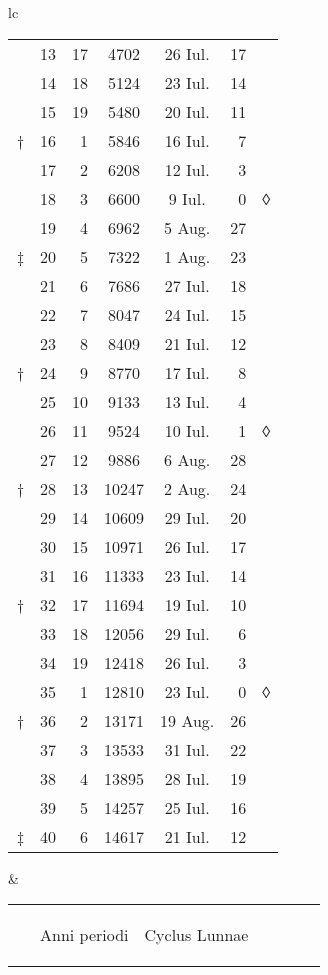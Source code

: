 \begin{tabular}{lc}
\begin{tabular}[t]{r rrccr l}
\cline{2-6}
~ & 13 & 17 & 4702 & 26 Iul. & 17 \\
~ & 14 & 18 & 5124 & 23 Iul. & 14 \\
~ & 15 & 19 & 5480 & 20 Iul. & 11 \\
† & 16 &  1 & 5846 & 16 Iul. &  7 \\
\cline{2-6}
~ & 17 &  2 & 6208 & 12 Iul. &  3 \\
~ & 18 &  3 & 6600 &  9 Iul. &  0 & ◊\\
~ & 19 &  4 & 6962 &  5 Aug. & 27 \\
‡ & 20 &  5 & 7322 &  1 Aug. & 23 \\
\cline{2-6}
~ & 21 &  6 & 7686 & 27 Iul. & 18 \\
~ & 22 &  7 & 8047 & 24 Iul. & 15 \\
~ & 23 &  8 & 8409 & 21 Iul. & 12 \\
† & 24 &  9 & 8770 & 17 Iul. &  8 \\
\cline{2-6}
~ & 25 & 10 &  9133 & 13 Iul. &  4 \\
~ & 26 & 11 &  9524 & 10 Iul. &  1 & ◊ \\
~ & 27 & 12 &  9886 &  6 Aug. & 28 \\
† & 28 & 13 & 10247 &  2 Aug. & 24 \\
\cline{2-6}
~ & 29 & 14 & 10609 & 29 Iul. & 20 \\
~ & 30 & 15 & 10971 & 26 Iul. & 17 \\
~ & 31 & 16 & 11333 & 23 Iul. & 14 \\
† & 32 & 17 & 11694 & 19 Iul. & 10 \\
\cline{2-6}
~ & 33 & 18 & 12056 & 29 Iul. &  6 \\
~ & 34 & 19 & 12418 & 26 Iul. &  3 \\
~ & 35 &  1 & 12810 & 23 Iul. &  0 & ◊ \\
† & 36 &  2 & 13171 & 19 Aug. & 26 \\
\cline{2-6}
~ & 37 &  3 & 13533 & 31 Iul. & 22 \\
~ & 38 &  4 & 13895 & 28 Iul. & 19 \\
~ & 39 &  5 & 14257 & 25 Iul. & 16 \\
‡ & 40 &  6 & 14617 & 21 Iul. & 12 \\
\cline{2-6}
\end{tabular}
&
\begin{tabular}[t]{r rrccr l}
~ &
\begin{rotate}{60}Anni periodi\end{rotate} &
\begin{rotate}{60}Cyclus Lunnae\end{rotate} &

\end{tabular}
\end{tabular}

